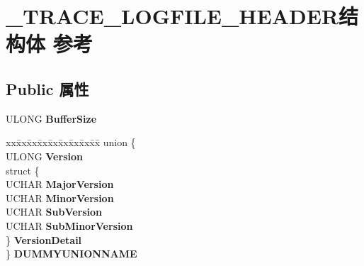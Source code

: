 \hypertarget{struct___t_r_a_c_e___l_o_g_f_i_l_e___h_e_a_d_e_r}{}\section{\+\_\+\+T\+R\+A\+C\+E\+\_\+\+L\+O\+G\+F\+I\+L\+E\+\_\+\+H\+E\+A\+D\+E\+R结构体 参考}
\label{struct___t_r_a_c_e___l_o_g_f_i_l_e___h_e_a_d_e_r}
\subsection*{Public 属性}
\begin{DoxyCompactItemize}
\item 
\mbox{\label{struct___t_r_a_c_e___l_o_g_f_i_l_e___h_e_a_d_e_r_a620dd7157962e6a4b4b80e4c60e8bbe3}} 
U\+L\+O\+NG {\bfseries Buffer\+Size}
\item 
\mbox{\label{struct___t_r_a_c_e___l_o_g_f_i_l_e___h_e_a_d_e_r_a9565b21ea73ecbf616902c3b6567fbf4}} 
\begin{tabbing}
xx\=xx\=xx\=xx\=xx\=xx\=xx\=xx\=xx\=\kill
union \{\\
\>ULONG {\bfseries Version}\\
\>struct \{\\
\>\>UCHAR {\bfseries MajorVersion}\\
\>\>UCHAR {\bfseries MinorVersion}\\
\>\>UCHAR {\bfseries SubVersion}\\
\>\>UCHAR {\bfseries SubMinorVersion}\\
\>\} {\bfseries VersionDetail}\\
\} {\bfseries DUMMYUNIONNAME}\\


\end{tabbing}
\end{DoxyCompactItemize}
